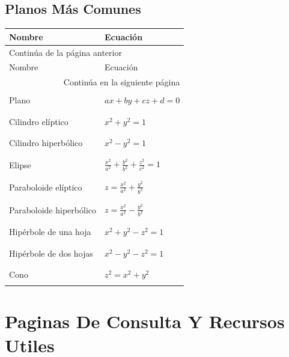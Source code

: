 \documentclass{article}
\begin{document}
\subsection{Planos Más Comunes}
\label{sec:org6ec23e8}
\begin{longtable}{|p{6cm}|p{5.4cm}|}
\hline
Nombre & Ecuación\\
\hline
\endfirsthead
\multicolumn{2}{l}{Continúa de la página anterior} \\
\hline

Nombre & Ecuación \\

\hline
\endhead
\hline\multicolumn{2}{r}{Continúa en la siguiente página} \\
\endfoot
\endlastfoot
\hline
 & \\
Plano & \(ax+by+cz+d=0\)\\
 & \\
\hline
 & \\
Cilindro elíptico & \(x^2+y^2=1\)\\
 & \\
\hline
 & \\
Cilindro hiperbólico & \(x^2-y^2=1\)\\
 & \\
\hline
 & \\
Elipse & \(\frac{x^2}{a^2}+\frac{y^2}{b^2}+\frac{z^2}{c^2}=1\)\\
 & \\
\hline
 & \\
Paraboloide elíptico & \(z=\frac{x^2}{a^2}+\frac{y^2}{b^2}\)\\
 & \\
\hline
 & \\
Paraboloide hiperbólico & \(z=\frac{x^2}{a^2}-\frac{y^2}{b^2}\)\\
 & \\
\hline
 & \\
Hipérbole de una hoja & \(x^2 + y^2 - z^2 = 1\)\\
 & \\
\hline
 & \\
Hipérbole de dos hojas & \(x^2 - y^2 - z^2 = 1\)\\
 & \\
\hline
 & \\
Cono & \(z^2 = x^2 + y^2\)\\
 & \\
\hline
\end{longtable}

\section{Paginas De Consulta Y Recursos Utiles}
\label{sec:org22907d8}
\end{document}
